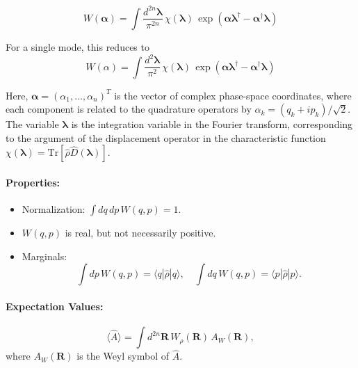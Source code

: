 \begin{equation}
W(\boldsymbol{\alpha}) = \int \frac{d^{2n}\boldsymbol{\lambda}}{\pi^{2n}} \,
\chi(\boldsymbol{\lambda})\,
\exp\!\left( \boldsymbol{\alpha} \boldsymbol{\lambda}^\dagger - \boldsymbol{\alpha}^\dagger \boldsymbol{\lambda} \right)
\label{eq:wigner_char_ft}
\end{equation}

For a single mode, this reduces to
\begin{equation}
W(\alpha) = \int \frac{d^2\boldsymbol{\lambda}}{\pi^2} \,
\chi(\boldsymbol{\lambda})\,
\exp\!\left( \boldsymbol{\alpha} \boldsymbol{\lambda}^\dagger - \boldsymbol{\alpha}^\dagger \boldsymbol{\lambda} \right)
\end{equation}

Here, $\boldsymbol{\alpha} = (\alpha_1, \dots, \alpha_n)^T$ is the vector of complex phase-space coordinates, where each component is related to the quadrature operators by $\alpha_k = (q_k + i p_k)/\sqrt{2}$. The variable $\boldsymbol{\lambda}$ is the integration variable in the Fourier transform, corresponding to the argument of the displacement operator in the characteristic function $\chi(\boldsymbol{\lambda}) = \text{Tr}[\hat{\rho} \hat{D}(\boldsymbol{\lambda})]$.

\paragraph{Properties:}
\begin{itemize}
    \item Normalization: $\int dq\,dp\, W(q,p) = 1$.
    \item $W(q,p)$ is real, but not necessarily positive.
    \item Marginals:
    \[
    \int dp\, W(q,p) = \langle q | \hat{\rho} | q \rangle, \quad
    \int dq\, W(q,p) = \langle p | \hat{\rho} | p \rangle.
    \]
\end{itemize}

\paragraph{Expectation Values:}
\begin{equation}
\langle \hat{A} \rangle = \int d^{2n}\mathbf{R}\,
W_\rho(\mathbf{R})\, A_W(\mathbf{R}),
\end{equation}
where $A_W(\mathbf{R})$ is the Weyl symbol of $\hat{A}$.







